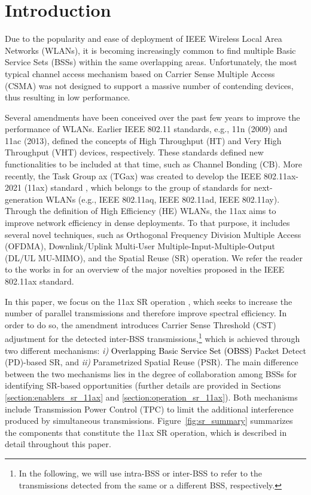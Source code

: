 \documentclass[preprint,12pt]{elsarticle}
\theoremstyle{plain}
\begin{document}
\newpage	
		
\section{Introduction}
\label{section:intro}

Due to the popularity and ease of deployment of IEEE Wireless Local Area Networks (WLANs), it is becoming increasingly common to find multiple Basic Service Sets (BSSs) within the same overlapping areas. Unfortunately, the most typical channel access mechanism based on Carrier Sense Multiple Access (CSMA) was not designed to support a massive number of contending devices, thus resulting in low performance.

Several amendments have been conceived over the past few years to improve the performance of WLANs. Earlier IEEE 802.11 standards, e.g., 11n (2009) and 11ac (2013), defined the concepts of High Throughput (HT) and Very High Throughput (VHT) devices, respectively. These standards defined new functionalities to be included at that time, such as Channel Bonding (CB). More recently, the Task Group ax (TGax) was created to develop the IEEE 802.11ax-2021 (11ax) standard \cite{tgax2019draft}, which belongs to the group of standards for next-generation WLANs (e.g., IEEE 802.11aq, IEEE 802.11ad, IEEE 802.11ay). Through the definition of High Efficiency (HE) WLANs, the 11ax aims to improve network efficiency in dense deployments. To that purpose, it includes several novel techniques, such as Orthogonal Frequency Division Multiple Access (OFDMA), Downlink/Uplink Multi-User Multiple-Input-Multiple-Output (DL/UL MU-MIMO), and the Spatial Reuse (SR) operation. We refer the reader to the works in \cite{bellalta2016ieee, afaqui2016ieee, qu2018survey, khorov2018tutorial} for an overview of the major novelties proposed in the IEEE 802.11ax standard.

In this paper, we focus on the 11ax SR operation \cite{merlin2009methods}, which seeks to increase the number of parallel transmissions and therefore improve spectral efficiency. In order to do so, the amendment introduces Carrier Sense Threshold (CST) adjustment for the detected inter-BSS transmissions,\footnote{In the following, we will use intra-BSS or inter-BSS to refer to the transmissions detected from the same or a different BSS, respectively.} which is achieved through two different mechanisms: \emph{i)} \textcolor{black}{Overlapping Basic Service Set (OBSS)} Packet Detect (PD)-based SR, and \emph{ii)} Parametrized Spatial Reuse (PSR). The main difference between the two mechanisms lies in the degree of collaboration among BSSs for identifying SR-based opportunities (further details are provided in Sections \ref{section:enablers_sr_11ax} and \ref{section:operation_sr_11ax}). Both mechanisms include Transmission Power Control (TPC) to limit the additional interference produced by simultaneous transmissions. Figure~\ref{fig:sr_summary} summarizes the components that constitute the 11ax SR operation, which \textcolor{black}{is} described in detail throughout this paper.
\end{document}
